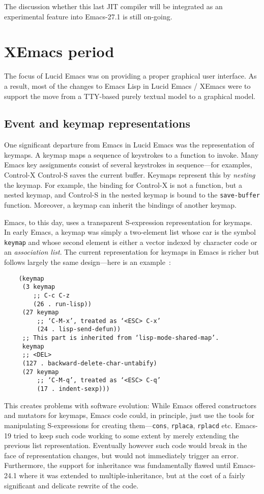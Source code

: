 \documentclass[format=acmsmall, review]{acmart}
\newcommand \Elisp {Emacs Lisp}
\begin{document}
The discussion whether this last JIT compiler will be integrated as an
experimental feature into Emacs-27.1 is still on-going.

\section{XEmacs period}         %
\label{sec:xemacs}

The focus of Lucid Emacs was on providing a proper graphical user
interface.  As a result, most of the changes to \Elisp{} in Lucid
Emacs / XEmacs were to support the move from a TTY-based purely
textual model to a graphical model.

\subsection{Event and keymap representations}

One significant departure from Emacs in Lucid Emacs was the
representation of keymaps.  A keymap maps a sequence of keystrokes to
a function to invoke.  Many Emacs key assignments consist of several
keystrokes in sequence---for examples, Control-X Control-S saves the
current buffer.  Keymaps represent this by \emph{nesting} the keymap.
For example, the binding for Control-X is not a function, but a nested
keymap, and Control-S in the nested keymap is bound to the
\texttt{save-buffer} function.  Moreover, a keymap can inherit the
bindings of another keymap.

Emacs, to this day, uses a transparent
S-expression representation for keymaps.
In early Emacs, a keymap was
simply a two-element list whose car is the symbol \texttt{keymap} and
whose second element is either a vector indexed by character code or an
\emph{association list}.
The current representation for keymaps in Emacs is richer but follows
largely the same design---here is an example~\cite{ELispManual2018}:
\begin{verbatim}
    (keymap
     (3 keymap
        ;; C-c C-z
        (26 . run-lisp))
     (27 keymap
         ;; ‘C-M-x’, treated as ‘<ESC> C-x’
         (24 . lisp-send-defun))
     ;; This part is inherited from ‘lisp-mode-shared-map’.
     keymap
     ;; <DEL>
     (127 . backward-delete-char-untabify)
     (27 keymap
         ;; ‘C-M-q’, treated as ‘<ESC> C-q’
         (17 . indent-sexp)))
\end{verbatim}
This creates problems with software evolution: While Emacs offered
constructors and mutators for keymaps, Emacs code could, in principle,
just use the tools for manipulating S-expressions for creating
them---\texttt{cons}, \texttt{rplaca}, \texttt{rplacd} etc.
Emacs-19 tried to keep such code working to some extent by merely
extending the previous list representation.
Eventually however such code would break in the face of representation
changes, but would not immediately trigger an error.  Furthermore, the
support for inheritance was fundamentally flawed until Emacs-24.1 where it
was extended to multiple-inheritance, but at the cost of a fairly significant
and delicate rewrite of the code.
\end{document}
